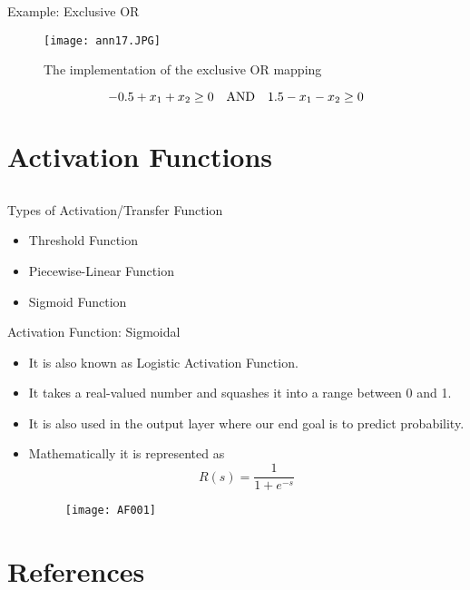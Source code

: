 \begin{frame}{Example: Exclusive OR }
\begin{figure}
\texttt{[image: ann17.JPG]}
\caption{The implementation of the exclusive OR mapping}
\end{figure}
\begin{equation}
-0.5+x_1+x_2\geq 0~~~{\rm AND}~~~1.5-x_1-x_2\geq0\nonumber
\end{equation}
\end{frame}

\section{Activation Functions}
\subsection{}

\begin{frame}{Types of Activation/Transfer Function}
\begin{itemize}
\item Threshold Function
\item Piecewise-Linear Function
\item Sigmoid Function
\end{itemize}
\end{frame}

\begin{frame}{Activation Function: Sigmoidal}
\begin{itemize}
\item It is also known as Logistic Activation Function.
\item It takes a real-valued number and squashes it into a range between 0 and 1. 
\item It is also used in the output layer where our end goal is to predict probability. 
\item Mathematically it is represented as
\begin{equation}
R(s) = \frac{1}{{1 + {e^{ - s}}}} \nonumber
\end{equation}
\begin{figure}[h]
\centering
\texttt{[image: AF001]}
\end{figure}
\end{itemize}
\end{frame}


\section{References}
